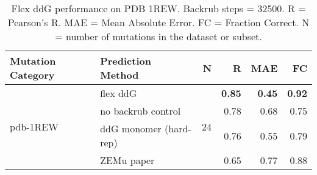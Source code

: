 \begin{table}
  \begin{tabular}{llrrrr}
\toprule
Mutation Category &       Prediction Method &   N &    R &  MAE &   FC \\
\midrule
 \multirow{ 4}{*}{pdb-1REW} & flex ddG & \multirow{ 4}{*}{24} & \textbf{0.85} & \textbf{0.45} & \textbf{0.92}  \\
 & no backrub control & & 0.78 & 0.68 & 0.75  \\
 & ddG monomer (hard-rep) & & 0.76 & 0.55 & 0.79  \\
 & ZEMu paper & & 0.65 & 0.77 & 0.88  \\
\bottomrule
\end{tabular}
  \caption[Flex ddG performance on PDB 1REW]{
    Flex ddG performance on PDB 1REW. Backrub steps = 32500. R = Pearson's R. MAE = Mean Absolute Error. FC = Fraction Correct. N = number of mutations in the dataset or subset.
  } \label{tab:table-pdb-1REW}
\end{table}

